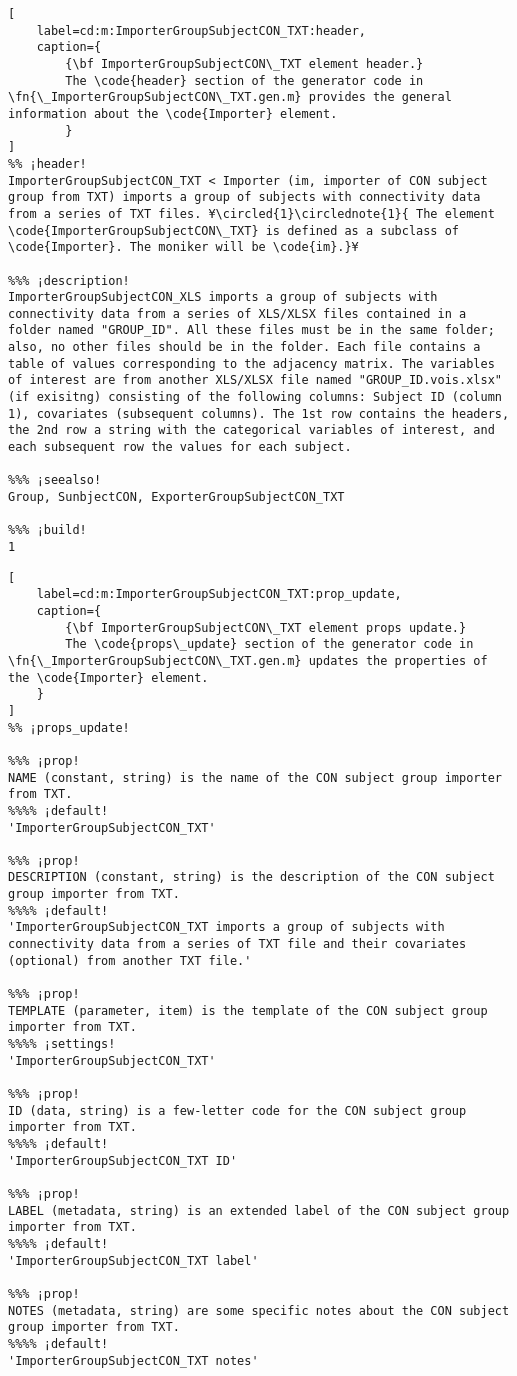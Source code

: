 \documentclass{tufte-handout}
\begin{document}
\begin{lstlisting}[
	label=cd:m:ImporterGroupSubjectCON_TXT:header,
	caption={
		{\bf ImporterGroupSubjectCON\_TXT element header.}
		The \code{header} section of the generator code in \fn{\_ImporterGroupSubjectCON\_TXT.gen.m} provides the general information about the \code{Importer} element.
		}
]
%% ¡header!
ImporterGroupSubjectCON_TXT < Importer (im, importer of CON subject group from TXT) imports a group of subjects with connectivity data from a series of TXT files. ¥\circled{1}\circlednote{1}{ The element \code{ImporterGroupSubjectCON\_TXT} is defined as a subclass of \code{Importer}. The moniker will be \code{im}.}¥

%%% ¡description!
ImporterGroupSubjectCON_XLS imports a group of subjects with connectivity data from a series of XLS/XLSX files contained in a folder named "GROUP_ID". All these files must be in the same folder; also, no other files should be in the folder. Each file contains a table of values corresponding to the adjacency matrix. The variables of interest are from another XLS/XLSX file named "GROUP_ID.vois.xlsx" (if exisitng) consisting of the following columns: Subject ID (column 1), covariates (subsequent columns). The 1st row contains the headers, the 2nd row a string with the categorical variables of interest, and each subsequent row the values for each subject.

%%% ¡seealso!
Group, SunbjectCON, ExporterGroupSubjectCON_TXT

%%% ¡build!
1
\end{lstlisting}

\begin{lstlisting}[
	label=cd:m:ImporterGroupSubjectCON_TXT:prop_update,
	caption={
		{\bf ImporterGroupSubjectCON\_TXT element props update.}
		The \code{props\_update} section of the generator code in \fn{\_ImporterGroupSubjectCON\_TXT.gen.m} updates the properties of the \code{Importer} element.
	}
]
%% ¡props_update!

%%% ¡prop!
NAME (constant, string) is the name of the CON subject group importer from TXT.
%%%% ¡default!
'ImporterGroupSubjectCON_TXT'

%%% ¡prop!
DESCRIPTION (constant, string) is the description of the CON subject group importer from TXT.
%%%% ¡default!
'ImporterGroupSubjectCON_TXT imports a group of subjects with connectivity data from a series of TXT file and their covariates (optional) from another TXT file.'

%%% ¡prop!
TEMPLATE (parameter, item) is the template of the CON subject group importer from TXT.
%%%% ¡settings!
'ImporterGroupSubjectCON_TXT'

%%% ¡prop!
ID (data, string) is a few-letter code for the CON subject group importer from TXT.
%%%% ¡default!
'ImporterGroupSubjectCON_TXT ID'

%%% ¡prop!
LABEL (metadata, string) is an extended label of the CON subject group importer from TXT.
%%%% ¡default!
'ImporterGroupSubjectCON_TXT label'

%%% ¡prop!
NOTES (metadata, string) are some specific notes about the CON subject group importer from TXT.
%%%% ¡default!
'ImporterGroupSubjectCON_TXT notes'
\end{lstlisting}
\end{document}
